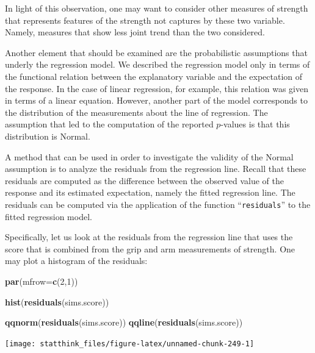\documentclass[
]{krantz}
\makeatletter
\newenvironment{Shaded}{\begin{snugshade}}{\end{snugshade}}
\newcommand{\DataTypeTok}[1]{\textcolor[rgb]{0.13,0.29,0.53}{#1}}
\newcommand{\DecValTok}[1]{\textcolor[rgb]{0.00,0.00,0.81}{#1}}
\newcommand{\KeywordTok}[1]{\textcolor[rgb]{0.13,0.29,0.53}{\textbf{#1}}}
\newcommand{\NormalTok}[1]{#1}
\newenvironment{kframe}{%
\medskip{}
\setlength{\fboxsep}{.8em}
 \def\at@end@of@kframe{}%
 \ifinner\ifhmode%
  \def\at@end@of@kframe{\end{minipage}}%
  \begin{minipage}{\columnwidth}%
 \fi\fi%
 \def\FrameCommand##1{\hskip\@totalleftmargin \hskip-\fboxsep
 \colorbox{shadecolor}{##1}\hskip-\fboxsep
     \hskip-\linewidth \hskip-\@totalleftmargin \hskip\columnwidth}%
 \MakeFramed {\advance\hsize-\width
   \@totalleftmargin\z@ \linewidth\hsize
   \@setminipage}}%
 {\par\unskip\endMakeFramed%
 \at@end@of@kframe}
\renewenvironment{Shaded}{\begin{kframe}}{\end{kframe}}
\theoremstyle{definition}
\theoremstyle{definition}
\theoremstyle{definition}
\theoremstyle{remark}
\makeatother
\begin{document}
In light of this observation, one may want to consider other measures of
strength that represents features of the strength not captures by these
two variable. Namely, measures that show less joint trend than the two
considered.

Another element that should be examined are the probabilistic
assumptions that underly the regression model. We described the
regression model only in terms of the functional relation between the
explanatory variable and the expectation of the response. In the case of
linear regression, for example, this relation was given in terms of a
linear equation. However, another part of the model corresponds to the
distribution of the measurements about the line of regression. The
assumption that led to the computation of the reported \(p\)-values is
that this distribution is Normal.

A method that can be used in order to investigate the validity of the
Normal assumption is to analyze the residuals from the regression line.
Recall that these residuals are computed as the difference between the
observed value of the response and its estimated expectation, namely the
fitted regression line. The residuals can be computed via the
application of the function ``\texttt{residuals}'' to the fitted regression
model.

Specifically, let us look at the residuals from the regression line that
uses the score that is combined from the grip and arm measurements of
strength. One may plot a histogram of the residuals:

\begin{Shaded}
\begin{Highlighting}[]
\KeywordTok{par}\NormalTok{(}\DataTypeTok{mfrow=}\KeywordTok{c}\NormalTok{(}\DecValTok{2}\NormalTok{,}\DecValTok{1}\NormalTok{))}

\KeywordTok{hist}\NormalTok{(}\KeywordTok{residuals}\NormalTok{(sims.score))}

\KeywordTok{qqnorm}\NormalTok{(}\KeywordTok{residuals}\NormalTok{(sims.score))}
\KeywordTok{qqline}\NormalTok{(}\KeywordTok{residuals}\NormalTok{(sims.score))}
\end{Highlighting}
\end{Shaded}

\begin{center}\texttt{[image: statthink\_files/figure-latex/unnamed-chunk-249-1]} \end{center}
\end{document}
